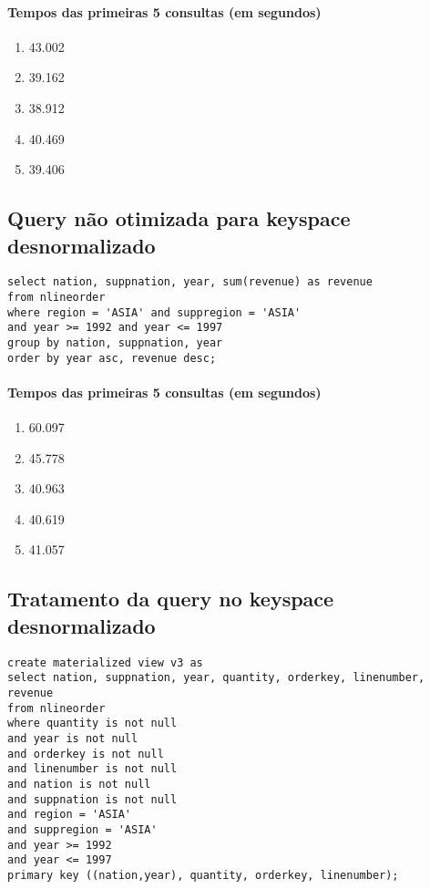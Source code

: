 \documentclass[12pt]{article}
\begin{document}
\paragraph{Tempos das primeiras 5 consultas (em segundos)}
\begin{enumerate}
\item 43.002
\item 39.162
\item 38.912
\item 40.469
\item 39.406
\end{enumerate}

\subsection{Query não otimizada para keyspace desnormalizado}

\begin{lstlisting}
select nation, suppnation, year, sum(revenue) as revenue 
from nlineorder
where region = 'ASIA' and suppregion = 'ASIA'
and year >= 1992 and year <= 1997
group by nation, suppnation, year
order by year asc, revenue desc; 
\end{lstlisting}

\paragraph{Tempos das primeiras 5 consultas (em segundos)}
\begin{enumerate}
\item 60.097
\item 45.778
\item 40.963
\item 40.619
\item 41.057
\end{enumerate}

\subsection{Tratamento da query no keyspace desnormalizado}

\begin{lstlisting}
create materialized view v3 as 
select nation, suppnation, year, quantity, orderkey, linenumber, revenue
from nlineorder
where quantity is not null
and year is not null
and orderkey is not null
and linenumber is not null
and nation is not null
and suppnation is not null
and region = 'ASIA'
and suppregion = 'ASIA'
and year >= 1992
and year <= 1997
primary key ((nation,year), quantity, orderkey, linenumber);
\end{lstlisting}
\end{document}
